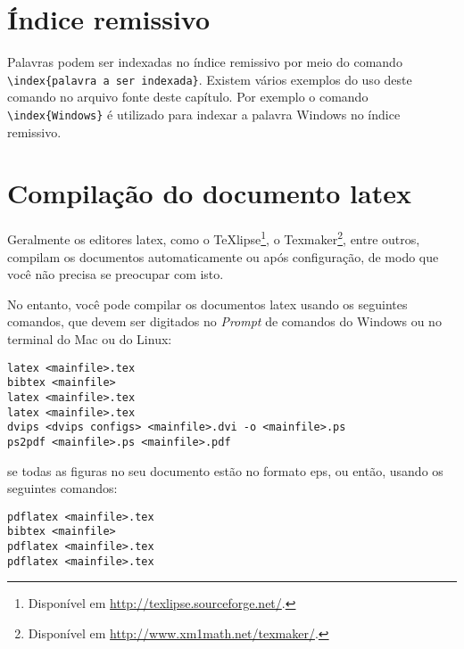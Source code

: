 \section{Índice remissivo}\label{sec:indice}

Palavras podem ser indexadas no índice remissivo por meio do comando \verb|\index{palavra a ser indexada}|. Existem vários exemplos do uso deste comando no arquivo fonte deste capítulo. Por exemplo o comando \verb|\index{Windows}| é utilizado para indexar a palavra Windows no índice remissivo.

\section{Compilação do documento latex}\label{sec:compilar}

Geralmente os editores \gls{latex}, como o TeXlipse\footnote{Disponível em \url{http://texlipse.sourceforge.net/}.}, o Texmaker\footnote{Disponível em \url{http://www.xm1math.net/texmaker/}.}, entre outros, compilam os documentos automaticamente ou após configuração, de modo que você não precisa se preocupar com isto.

No entanto, você pode compilar os documentos \gls{latex} usando os seguintes comandos, que devem ser digitados no \textit{Prompt} de comandos do Windows ou no terminal do Mac ou do Linux:

\begin{SingleSpacing}%
    \begin{verbatim}
latex <mainfile>.tex
bibtex <mainfile>
latex <mainfile>.tex
latex <mainfile>.tex
dvips <dvips configs> <mainfile>.dvi -o <mainfile>.ps
ps2pdf <mainfile>.ps <mainfile>.pdf
\end{verbatim}
\end{SingleSpacing}

\noindent se todas as figuras no seu documento estão no formato \gls{eps}, ou então, usando os seguintes comandos:

\begin{SingleSpacing}%
    \begin{verbatim}
pdflatex <mainfile>.tex
bibtex <mainfile>
pdflatex <mainfile>.tex
pdflatex <mainfile>.tex
\end{verbatim}
\end{SingleSpacing}

